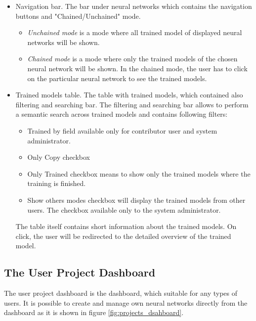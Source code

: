 \begin{itemize}
\item{Navigation bar.} The bar under neural networks which contains the navigation buttons and "Chained/Unchained" mode.
\begin{itemize}
\item \emph{Unchained mode} is a mode where all trained model of displayed neural networks will be shown.
\item \emph{Chained mode} is a mode where only the trained models of the chosen neural network will be shown. In the chained mode, the user has to click on the particular neural network to see the trained models. 
\end{itemize}

\item{Trained models table.} The table with trained models, which contained also filtering and searching bar.
The filtering and searching bar allows to perform a semantic search across trained models and contains following filters:
\begin{itemize}
\item Trained by field available only for contributor user and system administrator.
\item Only Copy checkbox
\item Only Trained checkbox means to show only the trained models where the training is finished.
\item Show others modes checkbox will display the trained models from other users. The checkbox available only to the system administrator.
\end{itemize}

The table itself contains short information about the trained models. On click, the user will be redirected to the detailed overview of the trained model.

\end{itemize}

\subsection{The User Project Dashboard}\label{The user projects dashboard}
The user project dashboard is the dashboard, which suitable for any types of users. It is possible to create and manage own neural networks directly from the dashboard as it is shown in figure \ref{fig:projects_dsahboard}.


